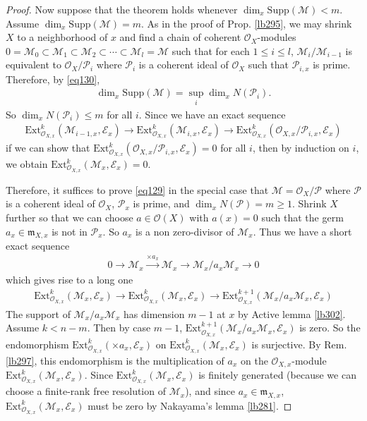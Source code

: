 \documentclass[12pt,b5paper,notitlepage]{report}
\theoremstyle{definition}
\theoremstyle{plain}
\newcommand{\scr}{\mathscr}
\newcommand{\Supp}{\mathrm{Supp}}
\newcommand{\Ext}{\mathrm{Ext}}
\newcommand{\mk}{\mathfrak m}
\numberwithin{equation}{section}
\begin{document}
\begin{proof}
Now suppose that the theorem holds whenever $\dim_x\Supp(\scr M)<m$. Assume $\dim_x\Supp(\scr M)=m$. As in the proof of Prop. \ref{lb295}, we may shrink $X$ to a neighborhood of $x$ and find a chain of coherent $\scr O_X$-modules $0=\scr M_0\subset\scr M_1\subset\scr M_2\subset\cdots\subset\scr M_l=\scr M$ such that for each $1\leq i\leq l$, $\scr M_i/\scr M_{i-1}$ is equivalent to $\scr O_X/\scr P_i$ where $\scr P_i$ is a coherent ideal of $\scr O_X$ such that $\scr P_{i,x}$ is prime. Therefore, by \eqref{eq130},
\begin{align*}
\dim_x\Supp(\scr M)=\sup_{i}\dim_x N(\scr P_i).
\end{align*}
So $\dim_x N(\scr P_i)\leq m$ for all $i$. Since we have an exact sequence
\begin{align*}
\Ext_{\scr O_{X,x}}^k(\scr M_{i-1,x},\scr E_x)\rightarrow\Ext_{\scr O_{X,x}}^k(\scr M_{i,x},\scr E_x)\rightarrow\Ext_{\scr O_{X,x}}^k(\scr O_{X,x}/\scr P_{i,x},\scr E_x)
\end{align*}
if we can show that $\Ext_{\scr O_{X,x}}^k(\scr O_{X,x}/\scr P_{i,x},\scr E_x)=0$ for all $i$, then by induction on $i$, we obtain $\Ext_{\scr O_{X,x}}^k(\scr M_x,\scr E_x)=0$.

Therefore, it suffices to prove \eqref{eq129} in the special case that $\scr M=\scr O_X/\scr P$ where $\scr P$ is a coherent ideal of $\scr O_X$, $\scr P_x$ is prime, and $\dim_x N(\scr P)=m\geq 1$. Shrink $X$ further so that we can choose $a\in\scr O(X)$ with $a(x)=0$ such that the germ $a_x\in\mk_{X,x}$ is not in $\scr P_x$. So $a_x$ is a non zero-divisor of $\scr M_x$. Thus we have a short exact sequence
\begin{align*}
0\rightarrow\scr M_x\xrightarrow{\times a_x}\scr M_x\rightarrow \scr M_x/a_x\scr M_x\rightarrow0
\end{align*}
which gives rise to a long one
\begin{align*}
\Ext_{\scr O_{X,x}}^k(\scr M_x,\scr E_x)\rightarrow\Ext_{\scr O_{X,x}}^k(\scr M_x,\scr E_x)\rightarrow\Ext_{\scr O_{X,x}}^{k+1}(\scr M_x/a_x\scr M_x,\scr E_x)
\end{align*}
The support of $\scr M_x/a_x\scr M_x$ has dimension $m-1$ at $x$ by Active lemma \ref{lb302}. Assume $k<n-m$. Then by case $m-1$, $\Ext_{\scr O_{X,x}}^{k+1}(\scr M_x/a_x\scr M_x,\scr E_x)$ is zero. So the endomorphism $\Ext_{\scr O_{X,x}}^k(\times a_x,\scr E_x)$ on $\Ext_{\scr O_{X,x}}^k(\scr M_x,\scr E_x)$ is surjective. By Rem. \ref{lb297}, this endomorphism is the multiplication of $a_x$ on the $\scr O_{X,x}$-module $\Ext_{\scr O_{X,x}}^k(\scr M_x,\scr E_x)$. Since $\Ext_{\scr O_{X,x}}^k(\scr M_x,\scr E_x)$ is finitely generated (because we can choose a finite-rank free resolution of $\scr M_x$), and since $a_x\in\mk_{X,x}$, $\Ext_{\scr O_{X,x}}^k(\scr M_x,\scr E_x)$ must be zero by Nakayama's lemma \ref{lb281}.
\end{proof}
\end{document}
